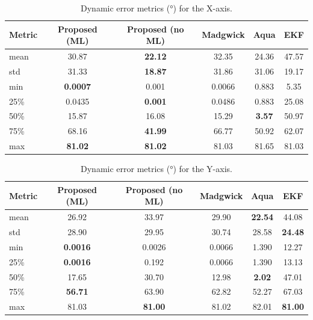 \documentclass{iutbscthesis}
\begin{document}
\begin{table}[H]
\centering
\scriptsize
\caption{Dynamic error metrics (°) for the X-axis.}
\label{tab:dynamic_x}
\begin{tabular}{lccccc}
\toprule
Metric & Proposed (ML) & Proposed (no ML) & Madgwick & Aqua & EKF \\
\midrule
mean & 30.87 & \textbf{22.12} & 32.35 & 24.36 & 47.57 \\
std & 31.33 & \textbf{18.87} & 31.86 & 31.06 & 19.17 \\
min & \textbf{0.0007} & 0.001 & 0.0066& 0.883 & 5.35 \\
25\% & 0.0435& \textbf{0.001} & 0.0486& 0.883 & 25.08 \\
50\% & 15.87 & 16.08 & 15.29 & \textbf{3.57} & 50.97 \\
75\% & 68.16 & \textbf{41.99} & 66.77 & 50.92 & 62.07 \\
max & \textbf{81.02} & \textbf{81.02} & 81.03 & 81.65 & 81.03 \\
\bottomrule
\end{tabular}
\end{table}

\begin{table}[H]
\centering
\scriptsize
\caption{Dynamic error metrics (°) for the Y-axis.}
\label{tab:dynamic_y}
\begin{tabular}{lccccc}
\toprule
Metric & Proposed (ML) & Proposed (no ML) & Madgwick & Aqua & EKF \\
\midrule
mean & 26.92 & 33.97 & 29.90 & \textbf{22.54} & 44.08 \\
std & 28.90 & 29.95 & 30.74 & 28.58 & \textbf{24.48} \\
min & \textbf{0.0016} & 0.0026 & 0.0066& 1.390 & 12.27 \\
25\% & \textbf{0.0016} & 0.192 & 0.0066& 1.390 & 13.13 \\
50\% & 17.65 & 30.70 & 12.98 & \textbf{2.02} & 47.01 \\
75\% & \textbf{56.71} & 63.90 & 62.82 & 52.27 & 67.03 \\
max & 81.03 & \textbf{81.00} & 81.02 & 82.01 & \textbf{81.00} \\
\bottomrule
\end{tabular}
\end{table}
\end{document}
